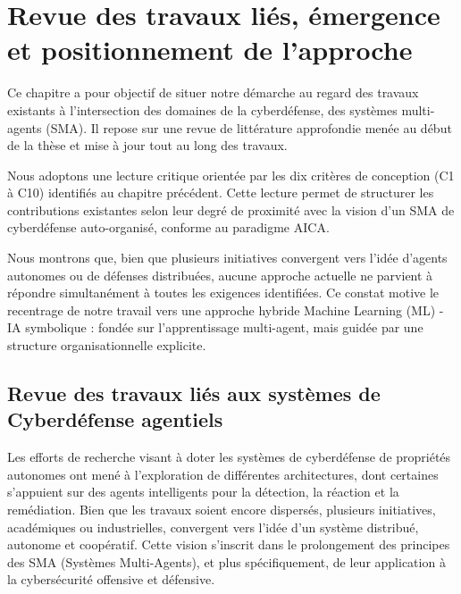 \documentclass[ twoside,openright,titlepage,numbers=noenddot,headinclude,%
                footinclude=true,cleardoublepage=empty,abstractoff, %
                BCOR=5mm,paper=a4,fontsize=11pt,%
                french,american,%
                ]{scrreprt}
\begin{document}
\chapter{Revue des travaux liés, émergence et positionnement de l'approche}

\noindent
Ce chapitre a pour objectif de situer notre démarche au regard des travaux existants à l'intersection des domaines de la cyberdéfense, des systèmes multi-agents (SMA). Il repose sur une revue de littérature approfondie menée au début de la thèse et mise à jour tout au long des travaux.

Nous adoptons une lecture critique orientée par les dix critères de conception (C1 à C10) identifiés au chapitre précédent. Cette lecture permet de structurer les contributions existantes selon leur degré de proximité avec la vision d'un SMA de cyberdéfense auto-organisé, conforme au paradigme AICA.

Nous montrons que, bien que plusieurs initiatives convergent vers l'idée d'agents autonomes ou de défenses distribuées, aucune approche actuelle ne parvient à répondre simultanément à toutes les exigences identifiées. Ce constat motive le recentrage de notre travail vers une approche hybride Machine Learning (ML) - IA symbolique : fondée sur l'apprentissage multi-agent, mais guidée par une structure organisationnelle explicite.

\section{Revue des travaux liés aux systèmes de Cyberdéfense agentiels}\label{sec:revue-cyberdef-agent}

Les efforts de recherche visant à doter les systèmes de cyberdéfense de propriétés autonomes ont mené à l'exploration de différentes architectures, dont certaines s'appuient sur des agents intelligents pour la détection, la réaction et la remédiation. Bien que les travaux soient encore dispersés, plusieurs initiatives, académiques ou industrielles, convergent vers l'idée d'un système distribué, autonome et coopératif. Cette vision s'inscrit dans le prolongement des principes des SMA (Systèmes Multi-Agents), et plus spécifiquement, de leur application à la cybersécurité offensive et défensive.
\end{document}
